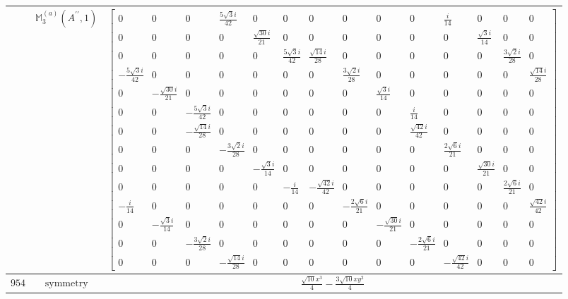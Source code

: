 \documentclass[fleqn,8pt,landscape]{jsarticle}
\begin{document}
\begin{longtable}{ccc}
$  $ & $ \mathbb{M}_{3}^{(a)}(A^{\prime\prime},1) $ & $ \begin{bmatrix} 0 & 0 & 0 & \frac{5 \sqrt{3} i}{42} & 0 & 0 & 0 & 0 & 0 & 0 & \frac{i}{14} & 0 & 0 & 0 \\ 0 & 0 & 0 & 0 & \frac{\sqrt{30} i}{21} & 0 & 0 & 0 & 0 & 0 & 0 & \frac{\sqrt{3} i}{14} & 0 & 0 \\ 0 & 0 & 0 & 0 & 0 & \frac{5 \sqrt{3} i}{42} & \frac{\sqrt{14} i}{28} & 0 & 0 & 0 & 0 & 0 & \frac{3 \sqrt{2} i}{28} & 0 \\ - \frac{5 \sqrt{3} i}{42} & 0 & 0 & 0 & 0 & 0 & 0 & \frac{3 \sqrt{2} i}{28} & 0 & 0 & 0 & 0 & 0 & \frac{\sqrt{14} i}{28} \\ 0 & - \frac{\sqrt{30} i}{21} & 0 & 0 & 0 & 0 & 0 & 0 & \frac{\sqrt{3} i}{14} & 0 & 0 & 0 & 0 & 0 \\ 0 & 0 & - \frac{5 \sqrt{3} i}{42} & 0 & 0 & 0 & 0 & 0 & 0 & \frac{i}{14} & 0 & 0 & 0 & 0 \\ 0 & 0 & - \frac{\sqrt{14} i}{28} & 0 & 0 & 0 & 0 & 0 & 0 & \frac{\sqrt{42} i}{42} & 0 & 0 & 0 & 0 \\ 0 & 0 & 0 & - \frac{3 \sqrt{2} i}{28} & 0 & 0 & 0 & 0 & 0 & 0 & \frac{2 \sqrt{6} i}{21} & 0 & 0 & 0 \\ 0 & 0 & 0 & 0 & - \frac{\sqrt{3} i}{14} & 0 & 0 & 0 & 0 & 0 & 0 & \frac{\sqrt{30} i}{21} & 0 & 0 \\ 0 & 0 & 0 & 0 & 0 & - \frac{i}{14} & - \frac{\sqrt{42} i}{42} & 0 & 0 & 0 & 0 & 0 & \frac{2 \sqrt{6} i}{21} & 0 \\ - \frac{i}{14} & 0 & 0 & 0 & 0 & 0 & 0 & - \frac{2 \sqrt{6} i}{21} & 0 & 0 & 0 & 0 & 0 & \frac{\sqrt{42} i}{42} \\ 0 & - \frac{\sqrt{3} i}{14} & 0 & 0 & 0 & 0 & 0 & 0 & - \frac{\sqrt{30} i}{21} & 0 & 0 & 0 & 0 & 0 \\ 0 & 0 & - \frac{3 \sqrt{2} i}{28} & 0 & 0 & 0 & 0 & 0 & 0 & - \frac{2 \sqrt{6} i}{21} & 0 & 0 & 0 & 0 \\ 0 & 0 & 0 & - \frac{\sqrt{14} i}{28} & 0 & 0 & 0 & 0 & 0 & 0 & - \frac{\sqrt{42} i}{42} & 0 & 0 & 0 \end{bmatrix} $ \\ \hline
$ 954 $ & $ \text{symmetry} $ & $ \frac{\sqrt{10} x^{3}}{4} - \frac{3 \sqrt{10} x y^{2}}{4} $ \\

\end{longtable}
\end{document}
